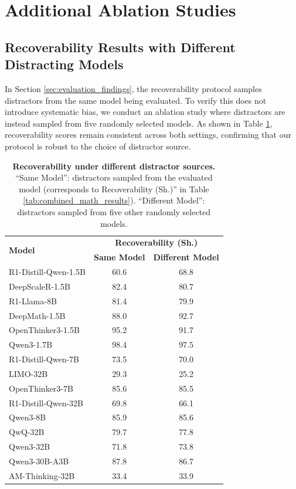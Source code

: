 \documentclass{article} %
\begin{document}
\newpage

\section{Additional Ablation Studies}



\subsection{Recoverability Results with Different Distracting Models}
In Section \ref{sec:evaluation_findings}, the recoverability protocol samples distractors from the same model being evaluated. To verify this does not introduce systematic bias, we conduct an ablation study where distractors are instead sampled from five randomly selected models. As shown in Table \ref{tab:ablation_recoverability_comparison}, recoverability scores remain consistent across both settings, confirming that our protocol is robust to the choice of distractor source.

\begin{table}[H]
  \centering
  \begin{tabular}{lcc}
    \toprule
    \multirow{2}{*}{\textbf{Model}} & \multicolumn{2}{c}{\textbf{Recoverability (Sh.)}} \\
     & \textbf{Same Model} & \textbf{Different Model} \\
    \midrule
    R1-Distill-Qwen-1.5B  & 60.6 & 68.8 \\
    DeepScaleR-1.5B       & 82.4 & 80.7 \\
    R1-Llama-8B           & 81.4 & 79.9 \\
    DeepMath-1.5B         & 88.0 & 92.7 \\
    OpenThinker3-1.5B     & 95.2 & 91.7 \\
    Qwen3-1.7B            & 98.4 & 97.5 \\
    \midrule
    R1-Distill-Qwen-7B    & 73.5 & 70.0 \\
    LIMO-32B              & 29.3 & 25.2 \\
    OpenThinker3-7B       & 85.6 & 85.5 \\
    R1-Distill-Qwen-32B   & 69.8 & 66.1 \\
    \midrule
    Qwen3-8B              & 85.9 & 85.6 \\
    QwQ-32B               & 79.7 & 77.8 \\
    Qwen3-32B             & 71.8 & 73.8 \\
    Qwen3-30B-A3B         & 87.8 & 86.7 \\
    AM-Thinking-32B       & 33.4 & 33.9 \\
    \bottomrule
  \end{tabular}
  \caption{\textbf{Recoverability under different distractor sources.} ``Same Model'': distractors sampled from the evaluated model (corresponds to Recoverability (Sh.)'' in Table \ref{tab:combined_math_results}). ``Different Model'': distractors sampled from five other randomly selected models.}
  \label{tab:ablation_recoverability_comparison}
\end{table}
\end{document}
